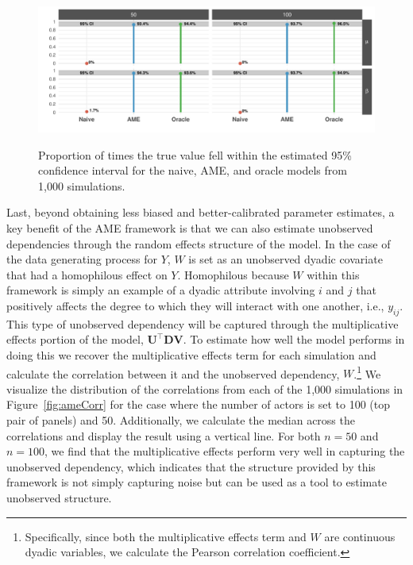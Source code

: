 \begin{figure}
	\centering
	\caption{Proportion of times the true value fell within the estimated 95\% confidence interval for the naive, AME, and oracle models from 1,000 simulations.}
	\label{fig:ameCalib}
	\includegraphics[width=1\textwidth]{ameSimCover_all.pdf} \\
\end{figure}

Last, beyond obtaining less biased and better-calibrated parameter estimates, a key benefit of the AME framework is that we can also estimate unobserved dependencies through the random effects structure of the model. In the case of the data generating process for $Y$, $W$ is set as an unobserved dyadic covariate that had a homophilous effect on $Y$. Homophilous because $W$ within this framework is simply an example of a dyadic attribute involving $i$ and $j$ that positively affects the degree to which they will interact with one another, i.e., $y_{ij}$. This type of unobserved dependency will be captured through the multiplicative effects portion of the model, $\mathbf{U}^{\top} \mathbf{D} \mathbf{V}$. To estimate how well the model performs in doing this we recover the multiplicative effects term for each simulation and calculate the correlation between it and the unobserved dependency, $W$.\footnote{Specifically, since both the multiplicative effects term and $W$ are continuous dyadic variables, we calculate the Pearson correlation coefficient.} We visualize the distribution of the correlations from each of the 1,000 simulations in Figure~\ref{fig:ameCorr} for the case where the number of actors is set to 100 (top pair of panels) and 50. Additionally, we calculate the median across the correlations and display the result using a vertical line. For both $n=50$ and $n=100$, we find that the multiplicative effects perform very well in capturing the unobserved dependency, which indicates that the structure provided by this framework is not simply capturing noise but can be used as a tool to estimate unobserved structure. 

